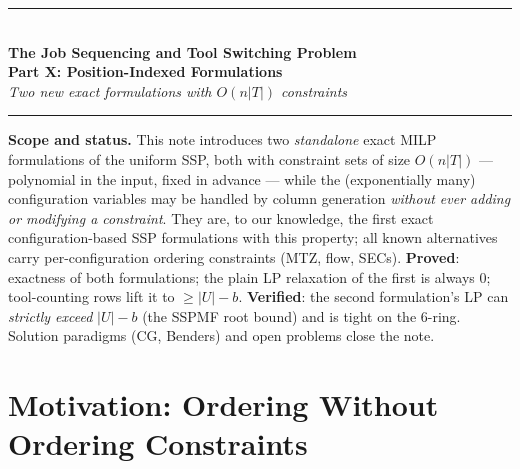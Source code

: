 \documentclass[11pt,a4paper]{article}
\theoremstyle{plain}
\theoremstyle{definition}
\begin{document}
\begin{center}
  {\color{navyblue}\rule{\textwidth}{2pt}}\\[0.4cm]
  {\LARGE\bfseries\color{navyblue}The Job Sequencing and Tool Switching Problem}\\[0.2cm]
  {\large\bfseries\color{navyblue}Part X: Position-Indexed Formulations}\\[0.1cm]
  {\large\itshape\color{midblue}Two new exact formulations with $O(n|T|)$ constraints}\\[0.3cm]
  {\color{navyblue}\rule{\textwidth}{2pt}}
\end{center}

\vspace{0.3cm}
\begin{mdframed}[backgroundcolor=lightblue,linecolor=navyblue,linewidth=1pt,
  innerleftmargin=14pt,innerrightmargin=14pt,innertopmargin=8pt,innerbottommargin=8pt]
\small\textbf{Scope and status.}
This note introduces two \emph{standalone} exact MILP formulations of the uniform
SSP, both with constraint sets of size $O(n|T|)$ --- polynomial in the input, fixed in
advance --- while the (exponentially many) configuration variables may be handled by
column generation \emph{without ever adding or modifying a constraint}. They are, to
our knowledge, the first exact configuration-based SSP formulations with this
property; all known alternatives carry per-configuration ordering constraints (MTZ,
flow, SECs). \textbf{Proved}: exactness of both formulations; the plain LP relaxation
of the first is always $0$; tool-counting rows lift it to $\ge|U|-b$.
\textbf{Verified}: the second formulation's LP can \emph{strictly exceed} $|U|-b$
(the SSPMF root bound) and is tight on the $6$-ring. Solution paradigms (CG,
Benders) and open problems close the note.
\end{mdframed}

\vspace{0.3cm}
\tableofcontents
\newpage

\section{Motivation: Ordering Without Ordering Constraints}
\label{sec:goal}
\end{document}
